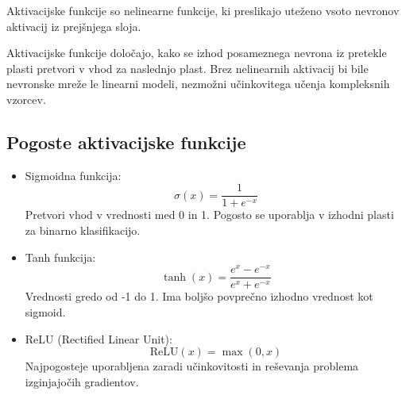 Aktivacijske funkcije so nelinearne funkcije, ki preslikajo uteženo vsoto nevronov aktivacij iz prejšnjega sloja.

Aktivacijske funkcije določajo, kako se izhod posameznega nevrona iz pretekle plasti pretvori v vhod za naslednjo plast. Brez nelinearnih aktivacij bi bile nevronske mreže le linearni modeli, nezmožni učinkovitega učenja kompleksnih vzorcev.

\subsection*{Pogoste aktivacijske funkcije}

\begin{itemize}
  \item Sigmoidna funkcija:
  \[
  \sigma(x) = \frac{1}{1 + e^{-x}}
  \]
  Pretvori vhod v vrednosti med 0 in 1. Pogosto se uporablja v izhodni plasti za binarno klasifikacijo.
  \begin{figure}[H]
\centering
{}
\end{figure}

  \item Tanh funkcija:
  \[
  \tanh(x) = \frac{e^x - e^{-x}}{e^x + e^{-x}}
  \]
  Vrednosti gredo od -1 do 1. Ima boljšo povprečno izhodno vrednost kot sigmoid.
\begin{figure}[h]
\centering
{}
\end{figure}

  \item ReLU (Rectified Linear Unit):
  \[
  \text{ReLU}(x) = \max(0, x)
  \]
  Najpogosteje uporabljena zaradi učinkovitosti in reševanja problema izginjajočih gradientov.
\begin{figure}[H]
\centering
{}
\end{figure}


\end{itemize}
